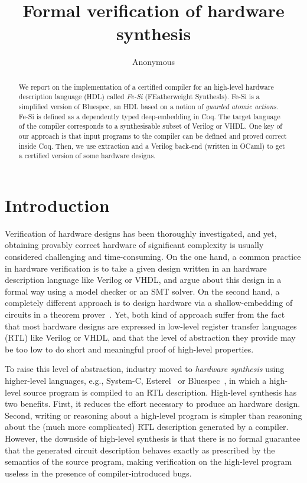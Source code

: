 \documentclass{llncs}
\author{Anonymous}
\institute{}
\title{Formal verification of hardware synthesis}
\begin{document}
\maketitle

\begin{abstract}
  We report on the implementation of a certified compiler for an
  high-level hardware description language (HDL) called \emph{Fe-Si}
  (FEatherweight SynthesIs).
  Fe-Si is a simplified version of Bluespec, an HDL based on a notion
  of \emph{guarded atomic actions}. Fe-Si is defined as a
  dependently typed deep-embedding in Coq. The target language of the
  compiler corresponds to a synthesisable subset of Verilog or VHDL.
  One key of our approach is that input programs to the compiler can
  be defined and proved correct inside Coq. Then, we use extraction
  and a Verilog back-end (written in OCaml) to get a certified version
  of some hardware designs.
\end{abstract}

\section*{Introduction}
Verification of hardware designs has been thoroughly investigated, and
yet, obtaining provably correct hardware of significant complexity is
usually considered challenging and time-consuming. 
%
On the one hand, a common practice in hardware verification is to take
a given design written in an hardware description language like
Verilog or VHDL, and argue about this design in a formal way using a
model checker or an SMT solver.
%
On the second hand, a completely different approach is to design
hardware via a shallow-embedding of circuits in a theorem
prover~\cite{hanna-veritas,UCAM-CL-TR-77,hunt89,vamp,certifying-circuits-in-type-theory}.
%
Yet, both kind of approach suffer from the fact that most hardware
designs are expressed in low-level register transfer languages (RTL)
like Verilog or VHDL, and that the level of abstraction they provide
may be too low to do short and meaningful proof of high-level
properties.

\medskip

To raise this level of abstraction, industry moved to \emph{hardware
  synthesis} using higher-level languages, e.g., System-C,
Esterel~\cite{DBLP:conf/birthday/Berry00} or
Bluespec~\cite{bluespec}, in which a high-level source program is
compiled to an RTL description. 
%
High-level synthesis has two benefits. 
%
First, it reduces the effort necessary to produce an hardware design.
%
Second, writing or reasoning about a high-level program is simpler
than reasoning about the (much more complicated) RTL description
generated by a compiler.
%
However, the downside of high-level synthesis is that there is no
formal guarantee that the generated circuit description behaves
exactly as prescribed by the semantics of the source
program, making verification on the high-level program useless in the
presence of compiler-introduced bugs.
%
\end{document}
